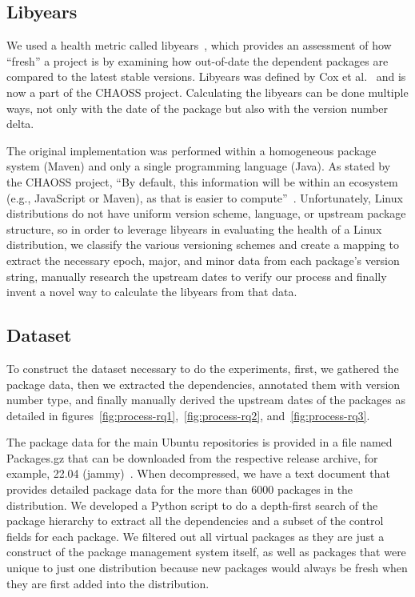 \documentclass[sn-mathphys-num]{sn-jnl}%
\theoremstyle{thmstyleone}%
\theoremstyle{thmstyletwo}%
\theoremstyle{thmstylethree}%
\begin{document}
\subsection{Libyears}
 
We used a health metric called libyears~\cite{cox_measuring_2015}, which provides an assessment of how ``fresh'' a project is by examining how out-of-date the dependent packages are compared to the latest stable versions. 
Libyears was defined by Cox et al.~\cite{cox_measuring_2015} and is now a part of the CHAOSS project. Calculating the libyears can be done multiple ways, not only with the date of the package but also with the version number delta. 

The original implementation was performed within a homogeneous package system (Maven) and only a single programming language (Java). As stated by the CHAOSS project, ``By default, this information will be within an ecosystem (e.g., JavaScript or Maven), as that is easier to compute''~\cite{noauthor_metric_nodate}. Unfortunately, Linux distributions do not have uniform version scheme, language, or upstream package structure, so in order to leverage libyears in evaluating the health of a Linux distribution, we classify the various versioning schemes and create a mapping to extract the necessary epoch, major, and minor data from each package's version string, manually research the upstream dates to verify our process and finally invent a novel way to calculate the libyears from that data.

\subsection{Dataset}
To construct the dataset necessary to do the experiments, first, we gathered the package data, then we extracted the dependencies, annotated them with version number type, and finally manually derived the upstream dates of the packages as detailed in figures~\ref{fig:process-rq1},~\ref{fig:process-rq2}, and~\ref{fig:process-rq3}.

The package data for the main Ubuntu repositories is provided in a file named Packages.gz that can be downloaded from the respective release archive, for example, 22.04 (jammy)~\cite{noauthor_index_nodate}. When decompressed, we have a text document that provides detailed package data for the more than 6000 packages in the distribution. We developed a Python script to do a depth-first search of the package hierarchy to extract all the dependencies and a subset of the control fields for each package. We filtered out all virtual packages as they are just a construct of the package management system itself, as well as packages that were unique to just one distribution because new packages would always be fresh when they are first added into the distribution. 
\end{document}
